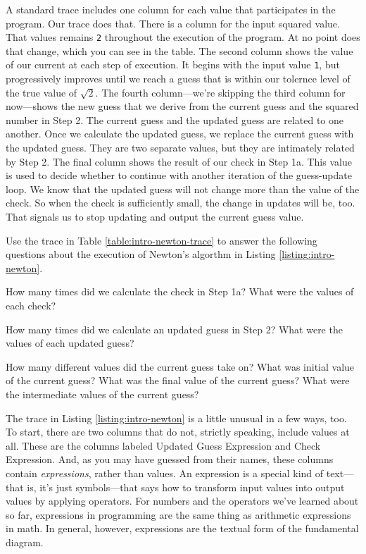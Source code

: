 A standard trace includes one column for each value that participates in the
program. Our trace does that. There is a column for the input squared value.
That values remains \texttt{2} throughout the execution of the program. At no
point does that change, which you can see in the table. The second column shows
the value of our current at each step of execution. It begins with the input
value \texttt{1}, but progressively improves until we reach a guess that is
within our tolernce level of the true value of $\sqrt{2}$. The fourth
column---we're skipping the third column for now---shows the new guess that we
derive from the current guess and the squared number in Step 2. The current
guess and the updated guess are related to one another. Once we calculate the
updated guess, we replace the current guess with the updated guess. They are two
separate values, but they are intimately related by Step 2. The final column
shows the result of our check in Step 1a. This value is used to decide whether
to continue with another iteration of the guess-update loop. We know that the
updated guess will not change more than the value of the check. So when the
check is sufficiently small, the change in updates will be, too. That signals us
to stop updating and output the current guess value.

Use the trace in Table \ref{table:intro-newton-trace} to answer the following
questions about the execution of Newton's algorthm in Listing
\ref{listing:intro-newton}.
\begin{question}
How many times did we calculate the check in Step 1a? What were the values of
each check?
\end{question}

\begin{question}
How many times did we calculate an updated guess in Step 2? What were the values
of each updated guess?
\end{question}

\begin{question}
How many different values did the current guess take on? What was initial value
of the current guess? What was the final value of the current guess? What were
the intermediate values of the current guess?
\end{question}

The trace in Listing \ref{listing:intro-newton} is a little unusual in a few
ways, too. To start, there are two columns that do not, strictly speaking,
include values at all. These are the columns labeled Updated Guess Expression
and Check Expression. And, as you may have guessed from their names, these
columns contain \emph{expressions}, rather than values. An expression is a
special kind of text---that is, it's just symbols---that says how to transform
input values into output values by applying operators. For numbers and the
operators we've learned about so far, expressions in programming are the same
thing as arithmetic expressions in math. In general, however, expressions are
the textual form of the fundamental diagram.

